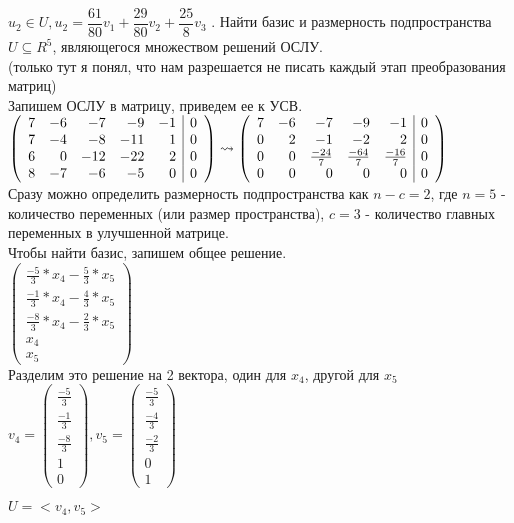 \documentclass[12pt, a4paper]{article}
\begin{document}
	 $u_2 \in U, u_2 = \dfrac{61}{80}v_1 + \dfrac{29}{80}v_2 + \dfrac{25}{8}v_3$ . Найти базис и размерность подпространства $U \subseteq R^5$, являющегося множеством решений ОСЛУ. \\
	 
	 (только тут я понял, что нам разрешается не писать каждый этап преобразования матриц) \\
	 
	 Запишем ОСЛУ в матрицу, приведем ее к УСВ. \\
	 
	 $
	 \left(\begin{array}{rrrrr|r}
	 	7 & -6 & -7 & -9 & -1 & 0 \\
	 	7 & -4 & -8 & -11 & 1 & 0 \\
	 	6 & 0 & -12 & -22 & 2 & 0 \\
	 	8 & -7 & -6 & -5 & 0 & 0
	 \end{array}\right) \rightsquigarrow
	 \left(\begin{array}{rrrrr|r}
	 	7 & -6 & -7 & -9 & -1 & 0 \\
	 	0 & 2 & -1 & -2 & 2 & 0 \\
	 	0 & 0 & \frac{-24}{7} & \frac{-64}{7} & \frac{-16}{7} & 0 \\
	 	0 & 0 & 0 & 0 & 0 & 0
	 \end{array}\right)
	 $ \\
	 
	 Сразу можно определить размерность подпространства как $n - c = 2$, где $n = 5$ - количество переменных (или размер пространства), $c = 3$ - количество главных переменных в улучшенной матрице. \\
	 
	 Чтобы найти базис, запишем общее решение. \\
	 
	 $
	 \left(\begin{matrix}
	 	\frac{-5}{3}*x_4-\frac{5}{3}*x_5 \\
	 	\frac{-1}{3}*x_4-\frac{4}{3}*x_5 \\
	 	\frac{-8}{3}*x_4-\frac{2}{3}*x_5 \\
	 	x_4 \\
	 	x_5
	 \end{matrix}\right)
	 $ \\
	 
	 Разделим это решение на 2 вектора, один для $x_4$, другой для $x_5$ \\
	 
	 $v_4 = \left(\begin{matrix}
	 	\frac{-5}{3} \\
	 	\frac{-1}{3} \\
	 	\frac{-8}{3} \\
	 	1 \\
	 	0
	 \end{matrix}\right), v_5 = \left(\begin{matrix}
	 \frac{-5}{3} \\
	 \frac{-4}{3} \\
	 \frac{-2}{3} \\
	 0 \\
	 1
	 \end{matrix}\right)$ \sspace
	 
	 $U = <v_4, v_5>$
\end{document}
